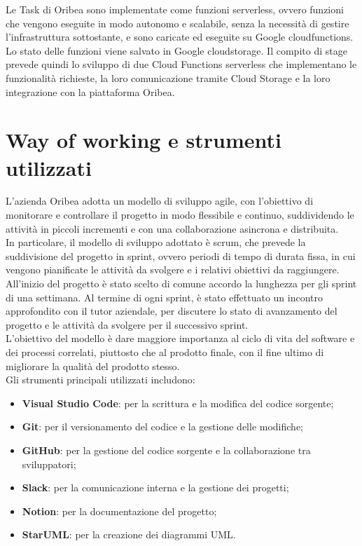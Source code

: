 Le Task di Oribea sono implementate come funzioni serverless, ovvero funzioni che vengono eseguite in modo autonomo e scalabile, senza la necessità di gestire l'infrastruttura sottostante, e sono caricate ed eseguite su Google \gls{cloudfunctions}\glsfirstoccur. Lo stato delle funzioni viene salvato in Google \gls{cloudstorage}\glsfirstoccur. Il compito di stage prevede quindi lo sviluppo di due Cloud Functions serverless che implementano le funzionalità richieste, la loro comunicazione tramite Cloud Storage e la loro integrazione con la piattaforma Oribea.\\


\section{Way of working e strumenti utilizzati}
\label{sec:way-of-working}

L’azienda Oribea adotta un modello di sviluppo \gls{agile}\glsfirstoccur, con l’obiettivo di monitorare e controllare il progetto in modo flessibile e continuo, suddividendo le attività in piccoli incrementi e con una collaborazione asincrona e distribuita.\\
In particolare, il modello di sviluppo adottato è \gls{scrum}\glsfirstoccur, che prevede la suddivisione del progetto in sprint, ovvero periodi di tempo di durata fissa, in cui vengono pianificate le attività da svolgere e i relativi obiettivi da raggiungere. All'inizio del progetto è stato scelto di comune accordo la lunghezza per gli sprint di una settimana. Al termine di ogni sprint, è stato effettuato un incontro approfondito con il tutor aziendale, per discutere lo stato di avanzamento del progetto e le attività da svolgere per il successivo sprint.\\
L’obiettivo del modello è dare maggiore importanza al ciclo di vita del software e dei processi correlati, piuttosto che al prodotto finale, con il fine ultimo di migliorare la qualità del prodotto stesso.\\

Gli strumenti principali utilizzati includono:
\begin{itemize}
    \item \textbf{Visual Studio Code}: per la scrittura e la modifica del codice sorgente;
    \item \textbf{Git}: per il versionamento del codice e la gestione delle modifiche;
    \item \textbf{GitHub}: per la gestione del codice sorgente e la collaborazione tra sviluppatori;
    \item \textbf{Slack}: per la comunicazione interna e la gestione dei progetti;
    \item \textbf{Notion}: per la documentazione del progetto;
    \item \textbf{StarUML}: per la creazione dei diagrammi UML.
\end{itemize}

